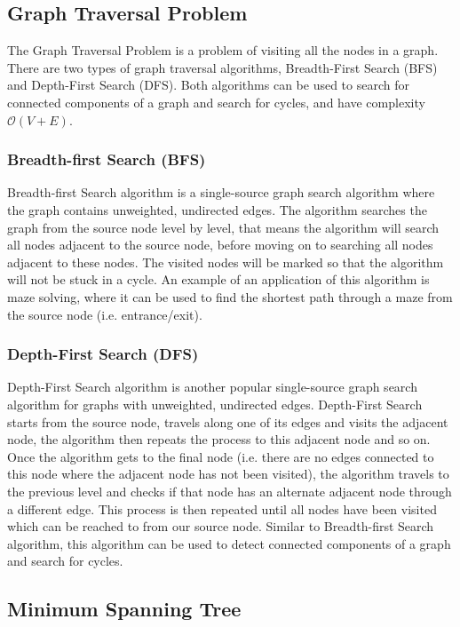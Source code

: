 \subsection{Graph Traversal Problem}

The Graph Traversal Problem is a problem of visiting all the nodes in a graph. There are two types of graph traversal algorithms, Breadth-First Search (BFS) and Depth-First Search (DFS). Both algorithms can be used to search for connected components of a graph and search for cycles, and have complexity $\mathcal{O}(V+E)$.

\subsubsection{Breadth-first Search (BFS)}

Breadth-first Search algorithm is a single-source graph search algorithm where the graph contains unweighted, undirected edges. The algorithm searches the graph from the source node level by level, that means the algorithm will search all nodes adjacent to the source node, before moving on to searching all nodes adjacent to these nodes. The visited nodes will be marked so that the algorithm will not be stuck in a cycle. An example of an application of this algorithm is maze solving, where it can be used to find the shortest path through a maze from the source node (i.e. entrance/exit).

\subsubsection{Depth-First Search (DFS)}

Depth-First Search algorithm is another popular single-source graph search algorithm for graphs with unweighted, undirected edges. Depth-First Search starts from the source node, travels along one of its edges and visits the adjacent node, the algorithm then repeats the process to this adjacent node and so on. Once the algorithm gets to the final node (i.e. there are no edges connected to this node where the adjacent node has not been visited), the algorithm travels to the previous level and checks if that node has an alternate adjacent node through a different edge. This process is then repeated until all nodes have been visited which can be reached to from our source node. Similar to Breadth-first Search algorithm, this algorithm can be used to detect connected components of a graph and search for cycles.

\subsection{Minimum Spanning Tree}

